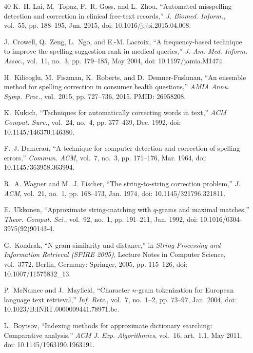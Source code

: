 \documentclass[journal,twoside,web]{ieeecolor}
\begin{document}
\begin{thebibliography}{40}
K.~H. Lai, M.~Topaz, F.~R. Goss, and L.~Zhou, ``Automated misspelling detection
and correction in clinical free-text records,'' \emph{J. Biomed. Inform.},
vol.~55, pp. 188--195, Jun. 2015, doi: 10.1016/j.jbi.2015.04.008.

J.~Crowell, Q.~Zeng, L.~Ngo, and E.-M. Lacroix, ``A frequency-based technique to
improve the spelling suggestion rank in medical queries,''
\emph{J. Am. Med. Inform. Assoc.}, vol.~11, no.~3, pp. 179--185, May 2004,
doi: 10.1197/jamia.M1474.

H.~Kilicoglu, M.~Fiszman, K.~Roberts, and D.~Demner-Fushman, ``An ensemble method
for spelling correction in consumer health questions,''
\emph{AMIA Annu. Symp. Proc.}, vol.~2015, pp. 727--736, 2015. PMID: 26958208.

K.~Kukich, ``Techniques for automatically correcting words in text,''
\emph{ACM Comput. Surv.}, vol.~24, no.~4, pp. 377--439, Dec. 1992,
doi: 10.1145/146370.146380.

F.~J. Damerau, ``A technique for computer detection and correction of spelling
errors,'' \emph{Commun. ACM}, vol.~7, no.~3, pp. 171--176, Mar. 1964,
doi: 10.1145/363958.363994.

R.~A. Wagner and M.~J. Fischer, ``The string-to-string correction problem,''
\emph{J. ACM}, vol.~21, no.~1, pp. 168--173, Jan. 1974,
doi: 10.1145/321796.321811.

E.~Ukkonen, ``Approximate string-matching with $q$-grams and maximal matches,''
\emph{Theor. Comput. Sci.}, vol.~92, no.~1, pp. 191--211, Jan. 1992,
doi: 10.1016/0304-3975(92)90143-4.

G.~Kondrak, ``N-gram similarity and distance,'' in \emph{String Processing and
Information Retrieval (SPIRE 2005)}, Lecture Notes in Computer Science,
vol.~3772, Berlin, Germany: Springer, 2005, pp. 115--126,
doi: 10.1007/11575832\_13.

P.~McNamee and J.~Mayfield, ``Character $n$-gram tokenization for European
language text retrieval,'' \emph{Inf. Retr.}, vol.~7, no.~1--2, pp. 73--97,
Jan. 2004, doi: 10.1023/B:INRT.0000009441.78971.be.

L.~Boytsov, ``Indexing methods for approximate dictionary searching: Comparative
analysis,'' \emph{ACM J. Exp. Algorithmics}, vol.~16, art.~1.1, May 2011,
doi: 10.1145/1963190.1963191.


\end{thebibliography}
\end{document}
